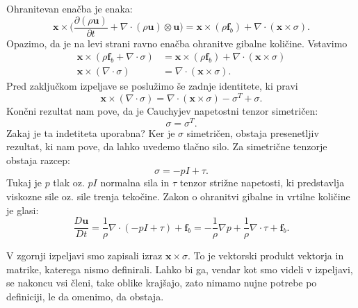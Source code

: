 \documentclass[mat2, tisk]{fmfdelo}
\newcommand{\bd}{\textbf}
\begin{document}
Ohranitevan enačba je enaka:
\begin{equation}
\bd{x} \times \Big(\frac{\partial (\rho\bd{u})}{\partial t} + \nabla\cdot (\rho\bd{u})\otimes \bd{u}\Big) = \bd{x}\times (\rho \bd{f}_b) + \nabla \cdot (\bd{x} \times \sigma).
\end{equation}
Opazimo, da je na levi strani ravno enačba ohranitve gibalne količine. Vstavimo 
\begin{align*}
\bd{x}\times (\rho \bd{f}_b + \nabla \cdot \sigma) &= \bd{x} \times (\rho \bd{f}_b) + \nabla \cdot (\bd{x} \times \sigma) \\
\bd{x} \times (\nabla \cdot \sigma) &= \nabla \cdot (\bd{x} \times \sigma).
\end{align*}
Pred zaključkom izpeljave se poslužimo še zadnje identitete, ki pravi 
$$
\bd{x} \times (\nabla \cdot \sigma) = \nabla \cdot (\bd{x} \times \sigma) - \sigma^T + \sigma.
$$
Končni rezultat nam pove, da je Cauchyjev napetostni tenzor simetričen:
$$
\sigma = \sigma^T.
$$
Zakaj je ta indetiteta uporabna? Ker je $\sigma$ simetričen, obstaja presenetljiv rezultat, ki nam pove, da 
lahko uvedemo tlačno silo. Za simetrične tenzorje obstaja razcep: 
$$
\sigma = -pI + \tau.
$$
Tukaj je $p$ tlak oz. $pI$ normalna sila in $\tau$ tenzor strižne napetosti, ki predstavlja viskozne sile oz.
sile trenja tekočine. Zakon o ohranitvi gibalne in vrtilne količine je glasi:
\begin{equation}
\frac{D \bd{u}}{D t} = \frac{1}{\rho} \nabla \cdot (-pI + \tau) + \bd{f}_b = -\frac{1}{\rho} \nabla p + \frac{1}{\rho} \nabla \cdot \tau + \bd{f}_b.
\end{equation}

\begin{opomba}
V zgornji izpeljavi smo zapisali izraz $\bd{x} \times \sigma$. To je vektorski produkt vektorja in matrike, 
katerega nismo definirali. Lahko bi ga, vendar kot smo videli v izpeljavi, se nakoncu vsi členi, 
take oblike krajšajo, zato nimamo nujne potrebe po definiciji, le da omenimo, da obstaja.
\end{opomba}
\end{document}
